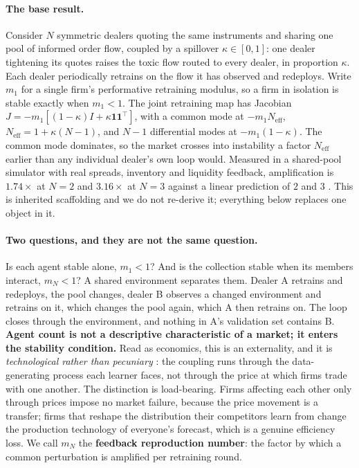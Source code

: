\documentclass{article}
\theoremstyle{plain}
\theoremstyle{definition}
\newcommand{\Neff}{N_{\mathrm{eff}}}
\newcommand{\mN}{m_N}
\begin{document}
\paragraph{The base result.}
Consider $N$ symmetric dealers quoting the same instruments and sharing one pool of informed order flow, coupled by a spillover $\kappa \in [0,1]$: one dealer tightening its quotes raises the toxic flow routed to every dealer, in proportion $\kappa$. Each dealer periodically retrains on the flow it has observed and redeploys. Write $m_1$ for a single firm's performative retraining modulus, so a firm in isolation is stable exactly when $m_1 < 1$. The joint retraining map has Jacobian $J = -m_1[(1-\kappa)I + \kappa \mathbf{1}\mathbf{1}^{\top}]$, with a common mode at $-m_1 \Neff$, $\Neff = 1+\kappa(N-1)$, and $N-1$ differential modes at $-m_1(1-\kappa)$. The common mode dominates, so the market crosses into instability a factor $\Neff$ earlier than any individual dealer's own loop would. Measured in a shared-pool simulator with real spreads, inventory and liquidity feedback, amplification is $1.74\times$ at $N=2$ and $3.16\times$ at $N=3$ against a linear prediction of $2$ and $3$ \citep{reflex2026}. This is inherited scaffolding and we do not re-derive it; everything below replaces one object in it.

\paragraph{Two questions, and they are not the same question.}
Is each agent stable alone, $m_1 < 1$? And is the collection stable when its members interact, $\mN < 1$? A shared environment separates them. Dealer A retrains and redeploys, the pool changes, dealer B observes a changed environment and retrains on it, which changes the pool again, which A then retrains on. The loop closes through the environment, and nothing in A's validation set contains B. \textbf{Agent count is not a descriptive characteristic of a market; it enters the stability condition.} Read as economics, this is an externality, and it is \emph{technological rather than pecuniary} \citep{buchanan1962}: the coupling runs through the data-generating process each learner faces, not through the price at which firms trade with one another. The distinction is load-bearing. Firms affecting each other only through prices impose no market failure, because the price movement is a transfer; firms that reshape the distribution their competitors learn from change the production technology of everyone's forecast, which is a genuine efficiency loss. We call $\mN$ the \textbf{feedback reproduction number}: the factor by which a common perturbation is amplified per retraining round.
\end{document}
